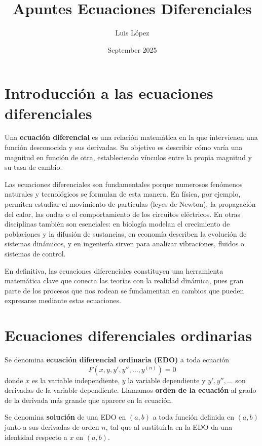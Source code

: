 \documentclass[a4paper,12pt]{article}
\title{Apuntes Ecuaciones Diferenciales}
\author{Luis López}
\date{September 2025}
\begin{document}
\maketitle %
\clearpage

\tableofcontents %
\clearpage
\section*{Introducción a las ecuaciones diferenciales}


Una \textbf{ecuación diferencial} es una relación matemática en la que intervienen una función desconocida y sus derivadas. 
Su objetivo es describir cómo varía una magnitud en función de otra, estableciendo vínculos entre la propia magnitud y su tasa de cambio.  

Las ecuaciones diferenciales son fundamentales porque numerosos fenómenos naturales y tecnológicos se formulan de esta manera. 
En física, por ejemplo, permiten estudiar el movimiento de partículas (leyes de Newton), la propagación del calor, las ondas o el comportamiento de los circuitos eléctricos. 
En otras disciplinas también son esenciales: en biología modelan el crecimiento de poblaciones y la difusión de sustancias, 
en economía describen la evolución de sistemas dinámicos, 
y en ingeniería sirven para analizar vibraciones, fluidos o sistemas de control.  

En definitiva, las ecuaciones diferenciales constituyen una herramienta matemática clave que conecta las teorías con la realidad dinámica, 
pues gran parte de los procesos que nos rodean se fundamentan en cambios que pueden expresarse mediante estas ecuaciones.

\clearpage
\section{Ecuaciones diferenciales ordinarias}

Se denomina \textbf{ecuación diferencial ordinaria (EDO)} a toda ecuación
\[
F(x,y,y',y'',\ldots,y^{(n)}) = 0
\]
donde $x$ es la variable independiente, $y$ la variable dependiente y $y',y'',\ldots$ son derivadas de la variable dependiente.  
Llamamos \textbf{orden de la ecuación} al grado de la derivada más grande que aparece en la ecuación.  

Se denomina \textbf{solución} de una EDO en $(a,b)$ a toda función definida en $(a,b)$ junto a sus derivadas de orden $n$, tal que al sustituirla en la EDO da una identidad respecto a $x$ en $(a,b)$.
\end{document}

